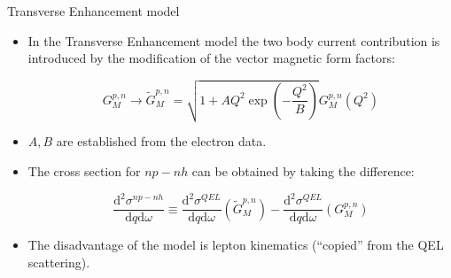 \begin{slide}[toc= TE model]{Transverse Enhancement model}
 
 \begin{itemize}
  
  \vspace{10pt}
  \item In the Transverse Enhancement model the two body current contribution is introduced by the modification of the vector magnetic form factors:
  
  $$G^{p,n}_M \rightarrow \tilde G^{p,n}_M = \sqrt{1 + AQ^2\exp{\left(-\frac{Q^2}{B}\right)}}G^{p,n}_M(Q^2)$$
  
  \item $A, B$ are established from the electron data.
  
  \item The cross section for $np-nh$ can be obtained by taking the difference:
  
  $$\frac{\mbox{d}^2\sigma^{np-nh}}{\mbox{d}q\mbox{d}\omega} \equiv \frac{\mbox{d}^2\sigma^{QEL}}{\mbox{d}q\mbox{d}\omega}(\tilde G^{p,n}_M) - \frac{\mbox{d}^2\sigma^{QEL}}{\mbox{d}q\mbox{d}\omega}(G^{p,n}_M)$$
  
  \item The disadvantage of the model is lepton kinematics (``copied'' from the QEL scattering).
 
 \end{itemize}
 
\end{slide}
